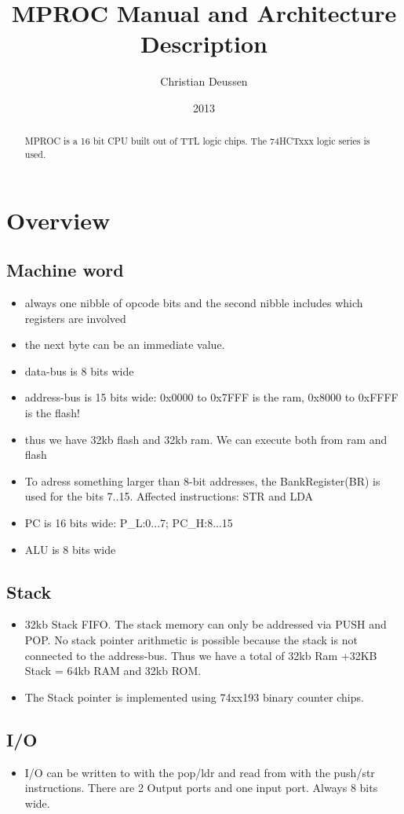 \documentclass[a4paper, 12pt]{article}
\title{MPROC Manual and Architecture Description}
\author{Christian Deussen}
\date{2013}
\begin{document}
	\maketitle
	\begin{abstract}
		MPROC is a 16 bit CPU built out of TTL logic chips. The 74HCTxxx logic series is used.
	\end{abstract}
	\tableofcontents
	\newpage
		\section{Overview}
	\subsection {Machine word}
	\begin{itemize}
		\item always one nibble of opcode bits and the second nibble includes which registers are involved
		\item the next byte can be an immediate value.
		\item data-bus is 8 bits wide
		\item address-bus is 15 bits wide: 0x0000 to 0x7FFF is the ram, 0x8000 to 0xFFFF is the flash! 
		\item thus we have 32kb flash and 32kb ram. We can execute both from ram and flash
		\item To adress something larger than 8-bit addresses, the BankRegister(BR) is used for the bits 7..15. Affected instructions: STR and LDA
		\item PC is 16 bits wide: P\_L:0...7; PC\_H:8...15
		\item ALU is 8 bits wide
	\end{itemize}

	\subsection {Stack}
	\begin{itemize}
		\item 32kb Stack FIFO. The stack memory can only be addressed via PUSH and POP. No stack pointer arithmetic is possible because the stack is not connected to the address-bus. Thus we have a total of 32kb Ram +32KB Stack = 64kb RAM and 32kb ROM.
		\item The Stack pointer is implemented using 74xx193 binary counter chips. 
	\end{itemize}

	\subsection{I/O}
	\begin{itemize}
		\item I/O can be written to with the pop/ldr and read from with the push/str instructions. There are 2 Output ports and one input port. Always 8 bits wide.
	\end{itemize}
\end{document}
